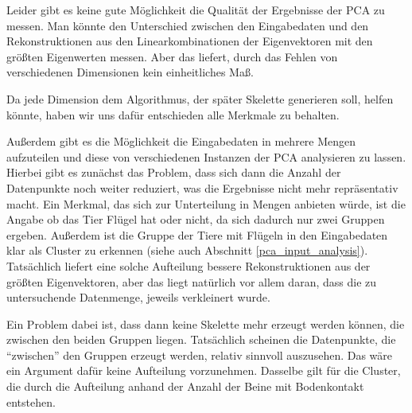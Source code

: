  Leider gibt es keine gute Möglichkeit die Qualität der Ergebnisse der PCA zu messen. Man könnte den Unterschied zwischen den Eingabedaten und den Rekonstruktionen aus den Linearkombinationen der Eigenvektoren mit den größten Eigenwerten messen. Aber das liefert, durch das Fehlen von verschiedenen Dimensionen kein einheitliches Maß.
 
 Da jede Dimension dem Algorithmus, der später Skelette generieren soll, helfen könnte, haben wir uns dafür entschieden alle Merkmale zu behalten.
 
 Außerdem gibt es die Möglichkeit die Eingabedaten in mehrere Mengen aufzuteilen und diese von verschiedenen Instanzen der PCA analysieren zu lassen. Hierbei gibt es zunächst das Problem, dass sich dann die Anzahl der Datenpunkte noch weiter reduziert, was die Ergebnisse nicht mehr repräsentativ macht.
 Ein Merkmal, das sich zur Unterteilung in Mengen anbieten würde, ist die Angabe ob das Tier Flügel hat oder nicht, da sich dadurch nur zwei Gruppen ergeben. Außerdem ist die Gruppe der Tiere mit Flügeln in den Eingabedaten klar als Cluster zu erkennen (siehe auch Abschnitt \ref{pca_input_analysis}). Tatsächlich liefert eine solche Aufteilung bessere Rekonstruktionen aus der größten Eigenvektoren, aber das liegt natürlich vor allem daran, dass die zu untersuchende Datenmenge, jeweils verkleinert wurde.
 
 Ein Problem dabei ist, dass dann keine Skelette mehr erzeugt werden können, die zwischen den beiden Gruppen liegen. Tatsächlich scheinen die Datenpunkte, die "`zwischen"' den Gruppen erzeugt werden, relativ sinnvoll auszusehen.
 Das wäre ein Argument dafür keine Aufteilung vorzunehmen. Dasselbe gilt für die Cluster, die durch die Aufteilung anhand der Anzahl der Beine mit Bodenkontakt entstehen.
 

